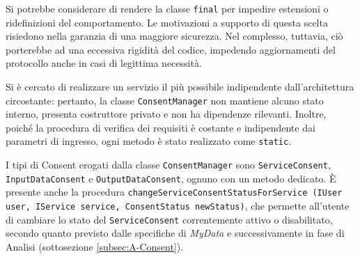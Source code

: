 Si potrebbe considerare di rendere la classe \texttt{final} per impedire estensioni o ridefinizioni del comportamento. Le motivazioni a supporto di questa scelta risiedono nella garanzia di una maggiore sicurezza. Nel complesso, tuttavia, ci\`o porterebbe ad una eccessiva rigidit\`a del codice, impedendo aggiornamenti del protocollo anche in casi di legittima necessit\`a.

Si \`e cercato di realizzare un servizio il pi\`u possibile indipendente dall'architettura circostante: pertanto, la classe \texttt{ConsentManager} non mantiene alcuno stato interno, presenta costruttore privato e non ha dipendenze rilevanti. Inoltre, poich\'e la procedura di verifica dei requisiti \`e costante e indipendente dai parametri di ingresso, ogni metodo \`e stato realizzato come \texttt{static}. 

I tipi di Consent erogati dalla classe \texttt{ConsentManager} sono \texttt{ServiceConsent}, \texttt{InputDataConsent} e \texttt{OutputDataConsent}, ognuno con un metodo dedicato. \`E presente anche la procedura \texttt{changeServiceConsentStatusForService (IUser user, IService service, ConsentStatus newStatus)}, che permette all’utente di cambiare lo stato del \texttt{ServiceConsent} correntemente attivo o disabilitato, secondo quanto previsto dalle specifiche di \textit{MyData} e successivamente in fase di Analisi (sottosezione \ref{subsec:A-Consent}).

